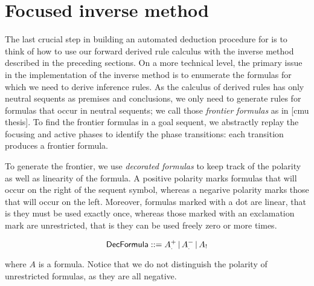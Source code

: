 \section{Focused inverse method}

The last crucial step in building an automated deduction procedure for \zss{} is
to think of how to use our forward derived rule calculus with the inverse method
described in the preceding sections. On a more technical level, the primary
issue in the implementation of the inverse method is to enumerate the formulas
for which we need to derive inference rules. As the calculus of derived rules
has only neutral sequents as premises and conclusions, we only need to generate
rules for formulas that occur in neutral sequents; we call those \emph{frontier
  formulas} as in [cmu thesis]. To find the frontier formulas in a goal sequent,
we abstractly replay the focusing and active phases to identify the phase
transitions: each transition produces a frontier formula.

To generate the frontier, we use \emph{decorated formulas} to keep track of the
polarity as well as linearity of the formula. A positive polarity marks formulas
that will occur on the right of the sequent symbol, whereas a negarive polarity
marks those that will occur on the left. Moreover, formulas marked with a dot
are linear, that is they must be used exactly once, whereas those marked with an
exclamation mark are unrestricted, that is they can be used freely zero or more
times.

\[
  \textsf{DecFormula} ::= A_.^+ \, | \,
    A_.^- \, | \,
    A_!
\]

where $A$ is a formula. Notice that we do not distinguish the polarity of
unrestricted formulas, as they are all negative.

